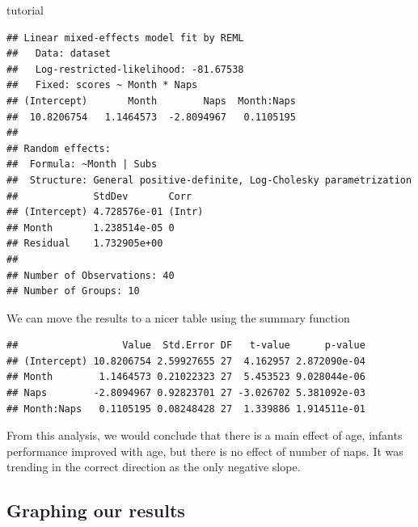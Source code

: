 \documentclass[]{book}
\newenvironment{Shaded}{\begin{snugshade}}{\end{snugshade}}
\newcommand{\CommentTok}[1]{\textcolor[rgb]{0.56,0.35,0.01}{\textit{#1}}}
\newcommand{\KeywordTok}[1]{\textcolor[rgb]{0.13,0.29,0.53}{\textbf{#1}}}
\newcommand{\NormalTok}[1]{#1}
\newcommand{\OperatorTok}[1]{\textcolor[rgb]{0.81,0.36,0.00}{\textbf{#1}}}
\newcommand{\StringTok}[1]{\textcolor[rgb]{0.31,0.60,0.02}{#1}}
\begin{document}
\begin{Shaded}
\begin{Highlighting}[]
\NormalTok{tutorial}
\end{Highlighting}
\end{Shaded}

\begin{verbatim}
## Linear mixed-effects model fit by REML
##   Data: dataset 
##   Log-restricted-likelihood: -81.67538
##   Fixed: scores ~ Month * Naps 
## (Intercept)       Month        Naps  Month:Naps 
##  10.8206754   1.1464573  -2.8094967   0.1105195 
## 
## Random effects:
##  Formula: ~Month | Subs
##  Structure: General positive-definite, Log-Cholesky parametrization
##             StdDev       Corr  
## (Intercept) 4.728576e-01 (Intr)
## Month       1.238514e-05 0     
## Residual    1.732905e+00       
## 
## Number of Observations: 40
## Number of Groups: 10
\end{verbatim}

We can move the results to a nicer table using the summary function

\begin{Shaded}
\end{Shaded}

\begin{verbatim}
##                  Value  Std.Error DF   t-value      p-value
## (Intercept) 10.8206754 2.59927655 27  4.162957 2.872090e-04
## Month        1.1464573 0.21022323 27  5.453523 9.028044e-06
## Naps        -2.8094967 0.92823701 27 -3.026702 5.381092e-03
## Month:Naps   0.1105195 0.08248428 27  1.339886 1.914511e-01
\end{verbatim}

From this analysis, we would conclude that there is a main effect of age, infants performance improved with age, but there is no effect of number of naps. It was trending in the correct direction as the only negative slope.

\hypertarget{graphing-our-results}{%
\subsection{Graphing our results}\label{graphing-our-results}}
\end{document}
